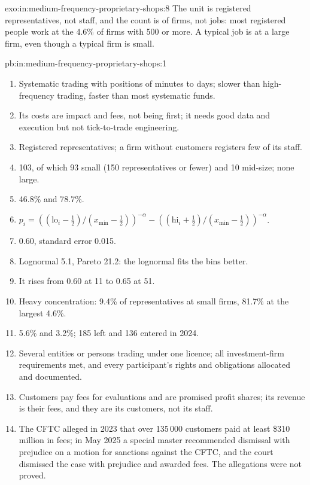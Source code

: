\begin{solution}{exo:in:medium-frequency-proprietary-shops:8}
The unit is registered representatives, not staff, and the count is of firms, not jobs: most registered people work at
the 4.6\% of firms with 500 or more. A typical job is at a large firm, even though a typical firm is small.
\end{solution}

\begin{solution}{pb:in:medium-frequency-proprietary-shops:1}
\begin{enumerate}
\item Systematic trading with positions of minutes to days; slower than high-frequency trading, faster than most
systematic funds.
\item Its costs are impact and fees, not being first; it needs good data and execution but not tick-to-trade engineering.
\item Registered representatives; a firm without customers registers few of its staff.
\item 103, of which 93 small (150 representatives or fewer) and 10 mid-size; none large.
\item 46.8\% and 78.7\%.
\item $p_i=((\mathrm{lo}_i-\tfrac12)/(x_{\min}-\tfrac12))^{-\alpha}-((\mathrm{hi}_i+\tfrac12)/(x_{\min}-\tfrac12))^{-\alpha}$.
\item $0.60$, standard error 0.015.
\item Lognormal 5.1, Pareto 21.2: the lognormal fits the bins better.
\item It rises from 0.60 at 11 to 0.65 at 51.
\item Heavy concentration: 9.4\% of representatives at small firms, 81.7\% at the largest 4.6\%.
\item 5.6\% and 3.2\%; 185 left and 136 entered in 2024.
\item Several entities or persons trading under one licence; all investment-firm requirements met, and every
participant's rights and obligations allocated and documented.
\item Customers pay fees for evaluations and are promised profit shares; its revenue is their fees, and they are its
customers, not its staff.
\item The CFTC alleged in 2023 that over 135\,000 customers paid at least \$310 million in fees; in May 2025 a special master
recommended dismissal with prejudice on a motion for sanctions against the CFTC, and the court dismissed the case with
prejudice and awarded fees. The allegations were not proved.

\end{enumerate}
\end{solution}
